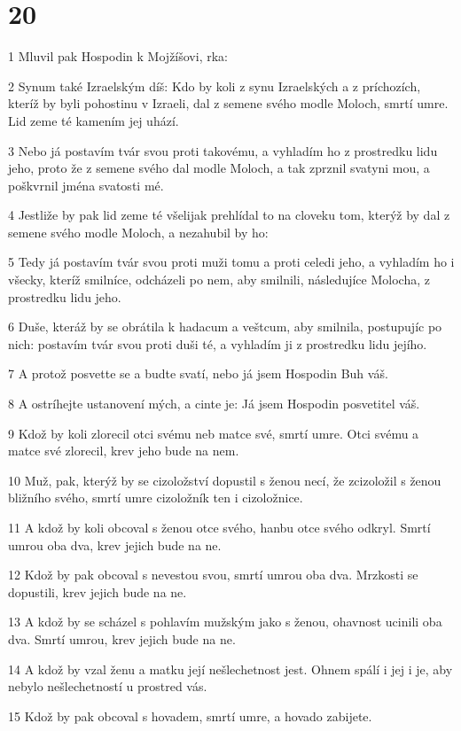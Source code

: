 \chapter{20}

\par 1 Mluvil pak Hospodin k Mojžíšovi, rka:
\par 2 Synum také Izraelským díš: Kdo by koli z synu Izraelských a z príchozích, kteríž by byli pohostinu v Izraeli, dal z semene svého modle Moloch, smrtí umre. Lid zeme té kamením jej uhází.
\par 3 Nebo já postavím tvár svou proti takovému, a vyhladím ho z prostredku lidu jeho, proto že z semene svého dal modle Moloch, a tak zprznil svatyni mou, a poškvrnil jména svatosti mé.
\par 4 Jestliže by pak lid zeme té všelijak prehlídal to na cloveku tom, kterýž by dal z semene svého modle Moloch, a nezahubil by ho:
\par 5 Tedy já postavím tvár svou proti muži tomu a proti celedi jeho, a vyhladím ho i všecky, kteríž smilníce, odcházeli po nem, aby smilnili, následujíce Molocha, z prostredku lidu jeho.
\par 6 Duše, kteráž by se obrátila k hadacum a veštcum, aby smilnila, postupujíc po nich: postavím tvár svou proti duši té, a vyhladím ji z prostredku lidu jejího.
\par 7 A protož posvette se a budte svatí, nebo já jsem Hospodin Buh váš.
\par 8 A ostríhejte ustanovení mých, a cinte je: Já jsem Hospodin posvetitel váš.
\par 9 Kdož by koli zlorecil otci svému neb matce své, smrtí umre. Otci svému a matce své zlorecil, krev jeho bude na nem.
\par 10 Muž, pak, kterýž by se cizoložství dopustil s ženou necí, že zcizoložil s ženou bližního svého, smrtí umre cizoložník ten i cizoložnice.
\par 11 A kdož by koli obcoval s ženou otce svého, hanbu otce svého odkryl. Smrtí umrou oba dva, krev jejich bude na ne.
\par 12 Kdož by pak obcoval s nevestou svou, smrtí umrou oba dva. Mrzkosti se dopustili, krev jejich bude na ne.
\par 13 A kdož by se scházel s pohlavím mužským jako s ženou, ohavnost ucinili oba dva. Smrtí umrou, krev jejich bude na ne.
\par 14 A kdož by vzal ženu a matku její nešlechetnost jest. Ohnem spálí i jej i je, aby nebylo nešlechetností u prostred vás.
\par 15 Kdož by pak obcoval s hovadem, smrtí umre, a hovado zabijete.
